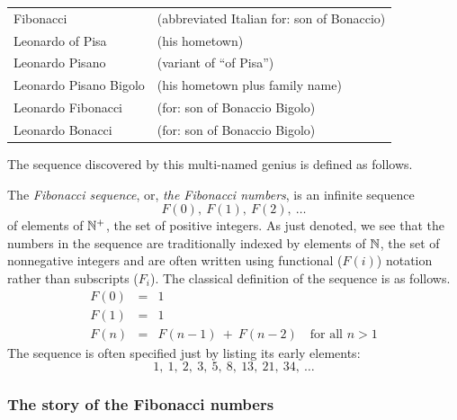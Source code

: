 \begin{tabular}{ll}
Fibonacci               & (abbreviated Italian for: son of Bonaccio) \\
Leonardo of Pisa        & (his hometown) \\
Leonardo Pisano         & (variant of ``of Pisa'') \\
Leonardo Pisano Bigolo  & (his hometown plus family name) \\
Leonardo Fibonacci      & (for: son of Bonaccio Bigolo) \\
Leonardo Bonacci        & (for: son of Bonaccio Bigolo) \\
\end{tabular}

\medskip

\noindent
The sequence discovered by this multi-named genius is defined as follows.

\medskip

The {\it Fibonacci sequence}, or, {\it the Fibonacci numbers}, is an
infinite sequence
\[ F(0), \ F(1), \ F(2), \ \ldots \]
of elements of $\mathbb{N}^+$, the set of positive integers.  As just denoted,
we see that the numbers in the sequence are traditionally indexed by
elements of $\mathbb{N}$, the set of nonnegative integers and are often
written using functional ($F(i)$) notation rather than subscripts
($F_i$).  The classical definition of the sequence is as follows.
\begin{eqnarray}
\nonumber
F(0) & = & 1 \\
\label{eq:Fibonacci-defn}
F(1) & = & 1 \\
\nonumber
F(n) & = & F(n-1) \ + \ F(n-2) \ \ \ \mbox{ for all } n > 1
\end{eqnarray}
The sequence is often specified just by listing its early elements:
\[ 1, \ 1, \ 2, \ 3, \ 5, \ 8, \ 13, \ 21, \ 34, \ \ldots \]


\subsubsection{The story of the Fibonacci numbers}
\label{sec:Fibonacci-story}

